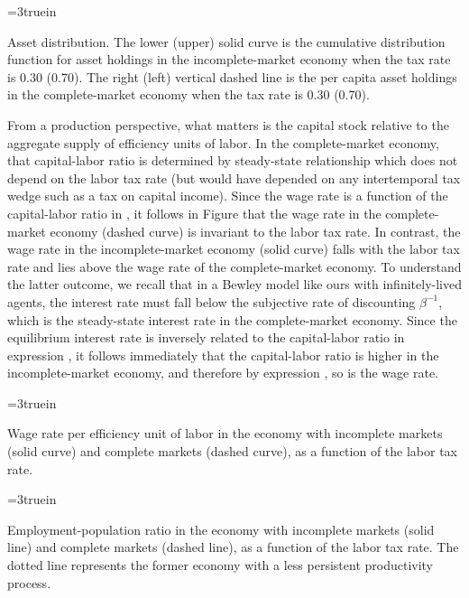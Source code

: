 \centerline{\epsfxsize=3truein}
\caption{Asset distribution. The lower (upper) solid curve is the
cumulative distribution function for asset holdings in the
incomplete-market economy when the tax rate is 0.30
(0.70). The right (left) vertical dashed line is the
per capita asset holdings in the complete-market
economy when the tax rate is 0.30 (0.70).}
\endfigure


From a production perspective, what matters is the capital stock
relative to the aggregate supply of efficiency units of labor.
In the complete-market economy, that capital-labor ratio
is determined by steady-state relationship 
which does not depend on the labor tax rate (but would have depended
on any intertemporal tax wedge such as a tax on capital
income). Since the wage rate is a function of the capital-labor
ratio in , it follows in Figure 
that the wage rate in the complete-market economy (dashed curve)
is invariant to the labor tax rate. In contrast, the wage
rate in the incomplete-market economy (solid curve) falls with
the labor tax rate and lies above the wage rate of the
complete-market economy. To understand the latter outcome,
we recall that in a Bewley model like ours with infinitely-lived
agents, the interest rate must fall below the subjective rate of
discounting $\beta^{-1}$, which is the steady-state interest
rate in the complete-market economy. Since the equilibrium interest
rate is inversely related to the capital-labor ratio in expression
, it follows immediately that the capital-labor
ratio is higher in the incomplete-market economy, and therefore by
expression , so is the wage rate.




\centerline{\epsfxsize=3truein}
\caption{Wage rate per efficiency unit of labor in the
economy with incomplete markets (solid curve) and complete
markets (dashed curve), as a function of the labor tax rate.}
\endfigure




\centerline{\epsfxsize=3truein}
\caption{Employment-population ratio in the
economy with incomplete markets (solid line) and complete
markets (dashed line), as a function of the labor tax rate.
The dotted line represents the former economy with a less persistent productivity process.}
\endfigure


